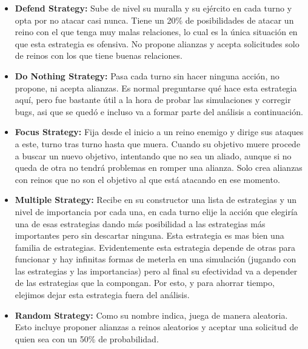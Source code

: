 \documentclass[11pt]{article}
\begin{document}
\begin{itemize}
            \item \textbf{Defend Strategy:} Sube de nivel su muralla y su ejército en cada turno y opta por no atacar casi nunca. 
            Tiene un 20\% de posibilidades de atacar un reino con el que tenga muy malas relaciones, lo cual es la única situación 
            en que esta estrategia es ofensiva. No propone alianzas y acepta solicitudes solo de reinos con los que tiene buenas 
            relaciones.

            \item \textbf{Do Nothing Strategy:} Pasa cada turno sin hacer ninguna acción, no propone, ni acepta alianzas. Es normal 
            preguntarse qué hace esta estrategia aquí, pero fue bastante útil a la hora de probar las simulaciones y corregir bugs, 
            asi que se quedó e incluso va a formar parte del análisis a continuación.

            \item \textbf{Focus Strategy:} Fija desde el inicio a un reino enemigo y dirige sus ataques a este, turno tras turno hasta 
            que muera. Cuando su objetivo muere procede a buscar un nuevo objetivo, intentando que no sea un aliado, aunque si no queda 
            de otra no tendrá problemas en romper una alianza. Solo crea alianzas con reinos que no son el objetivo al que está atacando 
            en ese momento.

            \item \textbf{Multiple Strategy:} Recibe en su constructor una lista de estrategias y un nivel de importancia por cada una, 
            en cada turno elije la acción que elegiría una de esas estrategias dando más posibilidad a las estrategias más importantes 
            pero sin descartar ninguna. Esta estrategia es mas bien una familia de estrategias. Evidentemente esta estrategia depende
            de otras para funcionar y hay infinitas formas de meterla en una simulación (jugando con las estrategias y las importancias)
            pero al final su efectividad va a depender de las estrategias que la compongan. Por esto, y para ahorrar tiempo, elejimos 
            dejar esta estrategia fuera del análisis.

            \item \textbf{Random Strategy:} Como su nombre indica, juega de manera aleatoria. Esto incluye proponer alianzas a reinos 
            aleatorios y aceptar una solicitud de quien sea con un 50\% de probabilidad.

        \end{itemize}
\end{document}
